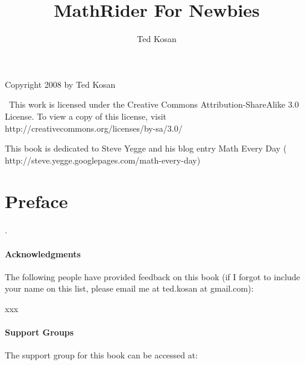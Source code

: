 \documentclass[12pt,twoside]{book}
\begin{document}
\frontmatter


\title{MathRider For Newbies}


\author{Ted Kosan}
\maketitle

\begin{center}
\begin{minipage}{3in}

\bigskip

{\centering
Copyright \textsf{{\textcopyright}} 2008 by Ted Kosan
\par}


\bigskip

\ This work is licensed under the Creative Commons
Attribution{}-ShareAlike 3.0 License. To view a copy of this license,
visit http://creativecommons.org/licenses/by{}-sa/3.0/
\end{minipage}
\end{center}




\linenumbers


This book is dedicated to Steve Yegge and his blog entry
{\textquotedbl}Math Every Day{\textquotedbl} (
http://steve.yegge.googlepages.com/math{}-every{}-day)


\renewcommand\contentsname{Table of Contents}
\tableofcontents

\bigskip



\part[Preface]{Preface}

.

\subsection{Acknowledgments}
The following people have provided feedback on this book (if I forgot to
include your name on this list, please email me at ted.kosan at
gmail.com):

xxx


\bigskip

\subsection[Support Groups]{Support Groups}
The support group for this book can be accessed at:
\end{document}
